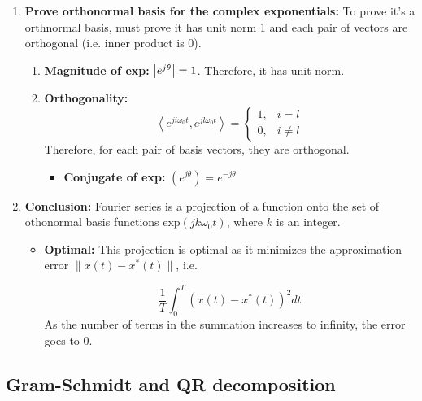 \begin{example}
\begin{enumerate}
                \item \textbf{Prove orthonormal basis for the complex exponentials:} To prove it's a orthnormal basis, must prove it has unit norm 1 and each pair of vectors are orthogonal (i.e. inner product is 0).
                \begin{enumerate}
                    \item \textbf{Magnitude of exp:} $\abs{e^{j\theta}}=1$. Therefore, it has unit norm.
                    \item \textbf{Orthogonality:}
                        \[
                        \left\langle e^{j i \omega_0 t}, e^{j l \omega_0 t} \right\rangle = 
                        \begin{cases}
                        1, & i = l \\
                        0, & i \neq l
                        \end{cases}
                        \]
                        Therefore, for each pair of basis vectors, they are orthogonal.
                    \begin{itemize}
                        \item \textbf{Conjugate of exp:} $(e^{j\theta}) = e^{-j \theta}$
                    \end{itemize}
                \end{enumerate}
                \item \textbf{Conclusion:} Fourier series is a projection of a function onto the set of othonormal basis functions $\text{exp}(jk\omega_0 t)$, where $k$ is an integer.
                \begin{itemize}
                    \item \textbf{Optimal:} This projection is optimal as it minimizes the approximation error \( \| x(t) - x^*(t) \| \), i.e.
                    
                    \[
                    \frac{1}{T} \int_0^T \left( x(t) - x^*(t) \right)^2 dt
                    \]
                    As the number of terms in the summation increases to infinity, the error goes to 0. 
                \end{itemize}
            \end{enumerate}
        \end{example}

\subsection{Gram-Schmidt and QR decomposition}
